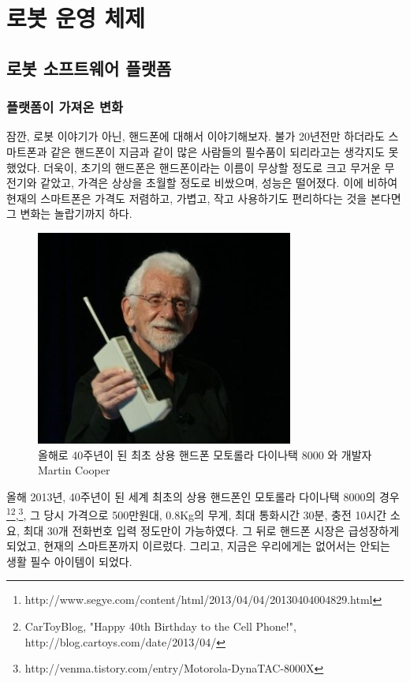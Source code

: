 
\chapter{로봇 운영 체제}

\section{로봇 소프트웨어 플랫폼}

\subsection{플랫폼이 가져온 변화}

잠깐, 로봇 이야기가 아닌, 핸드폰에 대해서 이야기해보자. 불가 20년전만 하더라도 스마트폰과 같은 핸드폰이 지금과 같이 많은 사람들의 필수품이 되리라고는 생각지도 못했었다.
더욱이, 초기의 핸드폰은 핸드폰이라는 이름이 무상할 정도로 크고 무거운 무전기와 같았고, 가격은 상상을 초월할 정도로 비쌌으며, 성능은 떨어졌다.
이에 비하여 현재의 스마트폰은 가격도 저렴하고, 가볍고, 작고 사용하기도 편리하다는 것을 본다면 그 변화는 놀랍기까지 하다.

\begin{figure}[h]
\centering\includegraphics[width=0.5\columnwidth]{pictures/chapter1/motorola_dynatac.jpg}
\caption{올해로 40주년이 된 최초 상용 핸드폰 모토롤라 다이나택 8000 와 개발자 Martin Cooper}
\end{figure}

올해 2013년, 40주년이 된 세계 최초의 상용 핸드폰인 모토롤라 다이나택 8000의 경우\footnote{http://www.segye.com/content/html/2013/04/04/20130404004829.html}\footnote{CarToyBlog, "Happy 40th Birthday to the Cell Phone!",  http://blog.cartoys.com/date/2013/04/},\footnote{http://venma.tistory.com/entry/Motorola-DynaTAC-8000X}, 그 당시 가격으로 500만원대, 0.8Kg의 무게, 최대 통화시간 30분, 충전 10시간 소요, 최대 30개 전화번호 입력 정도만이 가능하였다.
그 뒤로 핸드폰 시장은 급성장하게 되었고, 현재의 스마트폰까지 이르렀다. 그리고, 지금은 우리에게는 없어서는 안되는 생활 필수 아이템이 되었다.

